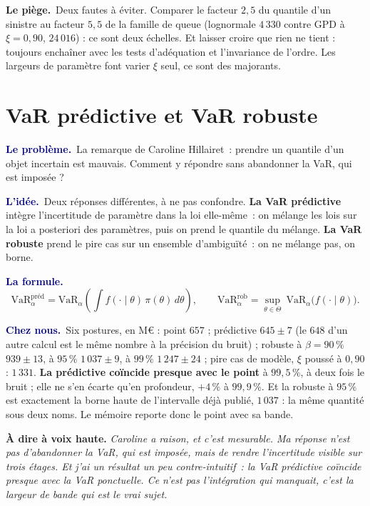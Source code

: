 \documentclass[11pt,a4paper]{article}
\newcommand{\lequoi}[1]{\smallskip\noindent\textcolor{navy}{\textbf{Le problème.}}\ #1\par}
\newcommand{\lidee}[1]{\smallskip\noindent\textcolor{navy}{\textbf{L'idée.}}\ #1\par}
\newcommand{\laformule}[1]{\smallskip\noindent\textcolor{navy}{\textbf{La formule.}}\ #1\par}
\newcommand{\cheznous}[1]{\smallskip\noindent\textcolor{navy}{\textbf{Chez nous.}}\ #1\par}
\newcommand{\lepiege}[1]{\smallskip\noindent\textcolor{accent}{\textbf{Le piège.}}\ #1\par}
\newcommand{\laphrase}[1]{\begin{phrasebox}\textbf{À dire à voix haute.} \emph{#1}\end{phrasebox}}
\begin{document}
\lepiege{Deux fautes à éviter. Comparer le facteur $2{,}5$ du quantile d'un sinistre au facteur
$5{,}5$ de la famille de queue (lognormale $4\,330$ contre GPD à $\xi=0{,}90$, $24\,016$) : ce sont
deux échelles. Et laisser croire que rien ne tient : toujours enchaîner avec les tests d'adéquation
et l'invariance de l'ordre. Les largeurs de paramètre font varier $\xi$ seul, ce sont des
majorants.}

\section{VaR prédictive et VaR robuste}

\lequoi{La remarque de Caroline Hillairet~: prendre un quantile d'un objet incertain est
mauvais. Comment y répondre sans abandonner la VaR, qui est imposée ?}

\lidee{Deux réponses différentes, à ne pas confondre.
\textbf{La VaR prédictive} intègre l'incertitude de paramètre dans la loi elle-même~: on
mélange les lois sur la loi a posteriori des paramètres, puis on prend le quantile du
mélange.
\textbf{La VaR robuste} prend le pire cas sur un ensemble d'ambiguïté~: on ne mélange pas,
on borne.}

\laformule{
\[
  \mathrm{VaR}^{\text{préd}}_\alpha = \mathrm{VaR}_\alpha\!
  \left(\int f(\cdot\mid\theta)\,\pi(\theta)\,d\theta\right),
  \qquad
  \mathrm{VaR}^{\text{rob}}_\alpha = \sup_{\theta\in\Theta}\ \mathrm{VaR}_\alpha
  \bigl(f(\cdot\mid\theta)\bigr).
\]}

\cheznous{Six postures, en M\euro{} : point $657$ ; prédictive $645\pm7$ (le $648$ d'un autre
calcul est le même nombre à la précision du bruit) ; robuste à $\beta=90\,\%$ $939\pm13$, à
$95\,\%$ $1\,037\pm9$, à $99\,\%$ $1\,247\pm24$ ; pire cas de modèle, $\xi$ poussé à $0{,}90$ :
$1\,331$. \textbf{La prédictive coïncide presque avec le point} à $99{,}5\,\%$, à deux fois le
bruit ; elle ne s'en écarte qu'en profondeur, $+4\,\%$ à $99{,}9\,\%$. Et la robuste à $95\,\%$
est exactement la borne haute de l'intervalle déjà publié, $1\,037$ : la même quantité sous deux
noms. Le mémoire reporte donc le point avec sa bande.}

\laphrase{Caroline a raison, et c'est mesurable. Ma réponse n'est pas d'abandonner la VaR,
qui est imposée, mais de rendre l'incertitude visible sur trois étages. Et j'ai un résultat
un peu contre-intuitif~: la VaR prédictive coïncide presque avec la VaR ponctuelle. Ce n'est
pas l'intégration qui manquait, c'est la largeur de bande qui est le vrai sujet.}
\end{document}
